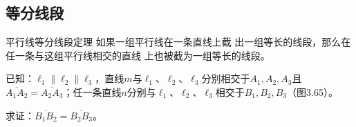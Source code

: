 \subsection{等分线段}

\begin{Theorem}
 {平行线等分线段定理} 如果一组平行线在一条直线上截
出一组等长的线段，那么在任一条与这组平行线相交的直线
上也被截为一组等长的线段。   
\end{Theorem}

已知：$\ell_1\parallel \ell_2\parallel \ell_3$，直线$m$与$\ell_1$、$\ell_2$、$\ell_3$分别相交于$A_1,A_2,A_3$且$\overline{A_1A_2}=\overline{A_2A_3}$；任一条直线$n$分别与$\ell_1$、$\ell_2$、$\ell_3$相交于$B_1,B_2,B_3$（图3.65）。

求证：$\overline{B_1B_2}=\overline{B_2B_3}$。

\begin{figure}
    \centering
\begin{tikzpicture}[scale=1.5]



\end{tikzpicture}
    \caption{}
\end{figure}

